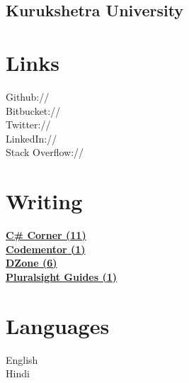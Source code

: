 \documentclass[]{gagan-resume}
\begin{document}
\begin{minipage}[t]{0.33\textwidth}
\subsection{Kurukshetra University}
\sectionsep




\section{Links} 
Github:// \href{https://github.com/sikrigagan}{} \\
Bitbucket:// \href{https://bitbucket.org/sikrigagan}{} \\
Twitter://  \href{https://twitter.com/sikrigagan}{} \\
LinkedIn://  \href{https://www.linkedin.com/in/sikrigagan}{} \\
Stack Overflow://  \href{https://stackoverflow.com/users/4129965/sikrigagan}{}
\sectionsep



\section{Writing} 
\textbf{\href{http://www.c-sharpcorner.com/members/gagan-sikri}{C\# Corner (11)}}\\
\textbf{\href{https://www.codementor.io/sikrigagan}{Codementor (1)}}\\
\textbf{\href{https://dzone.com/users/2733735/sikrigagan.html}{DZone (6)}}\\
\textbf{\href{https://www.pluralsight.com/guides/author/sikrigagan}{Pluralsight Guides (1)}}\\
\sectionsep




\section{Languages}
English \\
Hindi \\
\sectionsep





\end{minipage}
\end{document}
